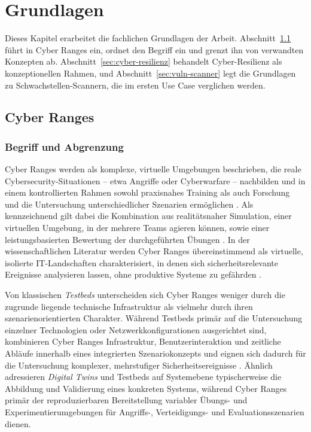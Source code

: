 \chapter{Grundlagen}
\label{chap:grundlagen}

Dieses Kapitel erarbeitet die fachlichen Grundlagen der Arbeit. Abschnitt~\ref{sec:cyber-ranges}
führt in Cyber Ranges ein, ordnet den Begriff ein und grenzt ihn von verwandten Konzepten ab.
Abschnitt~\ref{sec:cyber-resilienz} behandelt Cyber-Resilienz als konzeptionellen Rahmen, und
Abschnitt~\ref{sec:vuln-scanner} legt die Grundlagen zu Schwachstellen-Scannern, die im ersten
Use Case verglichen werden.

\section{Cyber Ranges}
\label{sec:cyber-ranges}

\subsection{Begriff und Abgrenzung}
\label{subsec:cr-begriff}

Cyber Ranges werden als komplexe, virtuelle Umgebungen beschrieben, die reale
Cybersecurity-Situationen -- etwa Angriffe oder Cyberwarfare -- nachbilden und in einem
kontrollierten Rahmen sowohl praxisnahes Training als auch Forschung und die Untersuchung
unterschiedlicher Szenarien ermöglichen \cite[2--3]{IntroductionCyberRanges2022}. Als kennzeichnend
gilt dabei die Kombination aus realitätsnaher Simulation, einer virtuellen Umgebung, in der
mehrere Teams agieren können, sowie einer leistungsbasierten Bewertung der durchgeführten
Übungen \cite[2--3]{IntroductionCyberRanges2022}. In der wissenschaftlichen Literatur werden Cyber
Ranges übereinstimmend als virtuelle, isolierte IT-Landschaften charakterisiert, in denen sich
sicherheitsrelevante Ereignisse analysieren lassen, ohne produktive Systeme zu gefährden
\cite{Chouliaras2021}.

Von klassischen \emph{Testbeds} unterscheiden sich Cyber Ranges weniger durch die zugrunde
liegende technische Infrastruktur als vielmehr durch ihren szenarienorientierten Charakter.
Während Testbeds primär auf die Untersuchung einzelner Technologien oder Netzwerkkonfigurationen
ausgerichtet sind, kombinieren Cyber Ranges Infrastruktur, Benutzerinteraktion und zeitliche
Abläufe innerhalb eines integrierten Szenariokonzepts und eignen sich dadurch für die
Untersuchung komplexer, mehrstufiger Sicherheitsereignisse \cite[2]{Chouliaras2021}. Ähnlich
adressieren \emph{Digital Twins} und Testbeds auf Systemebene typischerweise die Abbildung und
Validierung eines konkreten Systems, während Cyber Ranges primär der reproduzierbaren
Bereitstellung variabler Übungs- und Experimentierumgebungen für Angriffs-, Verteidigungs- und
Evaluationsszenarien dienen.

